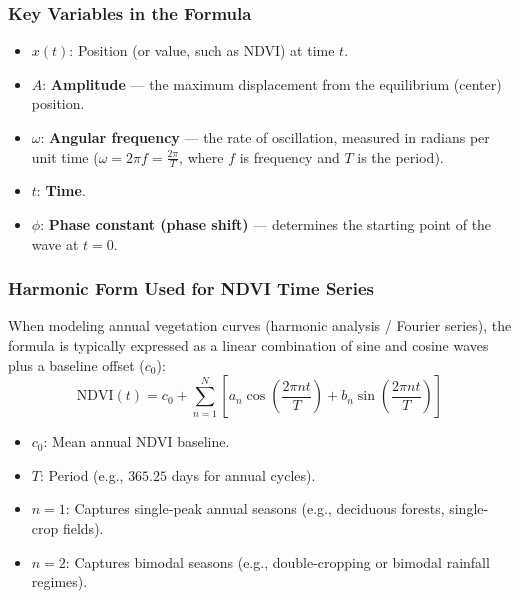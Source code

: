 \documentclass[12pt, letterpaper]{article}
\begin{document}
\subsubsection*{Key Variables in the Formula}
\begin{itemize}
    \item $x(t)$: Position (or value, such as NDVI) at time $t$.
    \item $A$: \textbf{Amplitude} --- the maximum displacement from the equilibrium (center) position.
    \item $\omega$: \textbf{Angular frequency} --- the rate of oscillation, measured in radians per unit time ($\omega = 2\pi f = \frac{2\pi}{T}$, where $f$ is frequency and $T$ is the period).
    \item $t$: \textbf{Time}.
    \item $\phi$: \textbf{Phase constant (phase shift)} --- determines the starting point of the wave at $t = 0$.
\end{itemize}

\subsubsection*{Harmonic Form Used for NDVI Time Series}
When modeling annual vegetation curves (harmonic analysis / Fourier series), the formula is typically expressed as a linear combination of sine and cosine waves plus a baseline offset ($c_0$):
\begin{equation}
\mathrm{NDVI}(t) = c_0 + \sum_{n=1}^{N} \left[ a_n \cos\left(\frac{2\pi n t}{T}\right) + b_n \sin\left(\frac{2\pi n t}{T}\right) \right]
\end{equation}

\begin{itemize}
    \item $c_0$: Mean annual NDVI baseline.
    \item $T$: Period (e.g., $365.25$ days for annual cycles).
    \item $n = 1$: Captures single-peak annual seasons (e.g., deciduous forests, single-crop fields).
    \item $n = 2$: Captures bimodal seasons (e.g., double-cropping or bimodal rainfall regimes).
\end{itemize}











\clearpage
\thispagestyle{plain} 
\printbibliography
\end{document}
